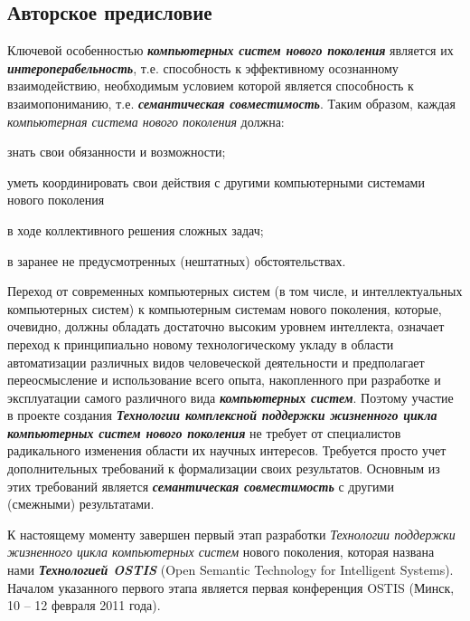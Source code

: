 \begin{partbacktext}
\part*{Авторское предисловие}
\label{chap_preface_auth}

Ключевой особенностью \textbf{\textit{компьютерных систем нового поколения}} является их \textbf{\textit{интероперабельность}}, т.е. способность к эффективному осознанному взаимодействию, необходимым условием которой является способность к взаимопониманию, т.е. \textbf{\textit{семантическая совместимость}}. Таким образом, каждая \textit{компьютерная система нового поколения} должна:

\begin{textitemize}
	\item знать свои обязанности и возможности;
	\item уметь координировать свои действия с другими компьютерными системами нового поколения
	\begin{textitemize}
	\item в ходе коллективного решения сложных задач;
	\item в заранее не предусмотренных (нештатных) обстоятельствах.
	\end{textitemize}	
\end{textitemize}

Переход от современных компьютерных систем (в том числе, и интеллектуальных компьютерных систем) к компьютерным системам нового поколения, которые, очевидно, должны обладать достаточно высоким уровнем интеллекта, означает переход к принципиально новому технологическому укладу в области автоматизации различных видов человеческой деятельности и предполагает переосмысление и использование всего опыта, накопленного при разработке и эксплуатации самого различного вида \textbf{\textit{компьютерных систем}}. Поэтому участие в проекте создания \textbf{\textit{Технологии комплексной поддержки жизненного цикла компьютерных систем нового поколения}} не требует от специалистов радикального изменения области их научных интересов. Требуется просто учет дополнительных требований к формализации своих результатов. Основным из этих требований является \textbf{\textit{семантическая совместимость}} с другими (смежными) результатами.

К настоящему моменту завершен первый этап разработки \textit{Технологии поддержки жизненного цикла компьютерных систем} нового поколения, которая названа нами \textbf{\textit{Технологией OSTIS}} (Open Semantic Technology for Intelligent Systems). Началом указанного первого этапа является первая конференция OSTIS (Минск, 10 -- 12 февраля 2011 года).


\end{partbacktext}
